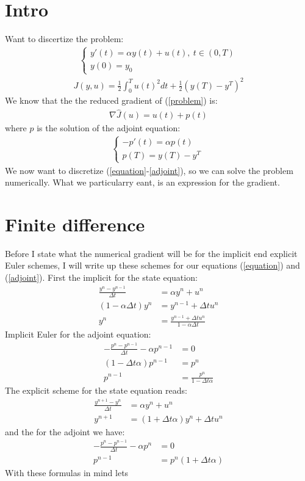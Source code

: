 \documentclass[11pt,a4paper]{article}
\begin{document}
\section{Intro}
Want to discertize the problem:
\begin{align}
\left\{
     \begin{array}{lr}
       	y'(t)=\alpha y(t) +u(t), \ t \in (0,T)\\
       	   y(0)=y_0
     \end{array}
   \right. \label{equation}
\end{align}
\begin{align}
J(y,u) = \frac{1}{2}\int_0^Tu(t)^2dt + \frac{1}{2}(y(T)-y^T)^2
\label{problem}
\end{align}
We know that the the reduced gradient of (\ref{problem}) is:
\begin{align}
\nabla\hat{J}(u) = u(t)+p(t) \label{gradiant}
\end{align}
where $p$ is the solution of the adjoint equation:
\begin{align}   
  \left\{
     \begin{array}{lr}
	-p'(t) = \alpha p(t) \\
	p(T) = y(T)-y^T     \
	\end{array}
   \right. \label{adjoint}
\end{align}
We now want to discretize (\ref{equation}-\ref{adjoint}), so we can solve the problem numerically. What we particularry eant, is an expression for the gradient. 
\section{Finite difference}
Before I state what the numerical gradient will be for the implicit end explicit Euler schemes, I will write up these schemes for our equations (\ref{equation}) and (\ref{adjoint}). First the implicit for the state equation:
\begin{align}
\frac{y^n-y^{n-1}}{\Delta t} &= \alpha y^{n} + u^{n} \\
(1-\alpha\Delta t)y^{n} &= y^{n-1} +\Delta t u^{n} \\
y^n &=\frac{y^{n-1} +\Delta t u^{n}}{1-\alpha\Delta t} \label{I_state}
\end{align}
Implicit Euler for the adjoint equation:
\begin{align}
-\frac{p^n-p^{n-1}}{\Delta t} -\alpha p^{n-1} &=0 \\
(1-\Delta t\alpha)p^{n-1}&=p^n \\
p^{n-1} &= \frac{p^n}{1-\Delta t\alpha} \label{I_adjoint}
\end{align}
The explicit scheme for the state equation reads:
\begin{align}
\frac{y^{n+1}-y^{n}}{\Delta t} &= \alpha y^{n} + u^{n} \\
y^{n+1}&=(1 +\Delta t\alpha) y^{n} + \Delta t u^{n}\label{E_state}
\end{align} 
and the for the adjoint we have:
\begin{align}
-\frac{p^n-p^{n-1}}{\Delta t} -\alpha p^{n} &=0 \\
p^{n-1} &=p^n(1 +\Delta t\alpha)\label{E_adjoint}
\end{align}
With these formulas in mind lets 
\end{document}
